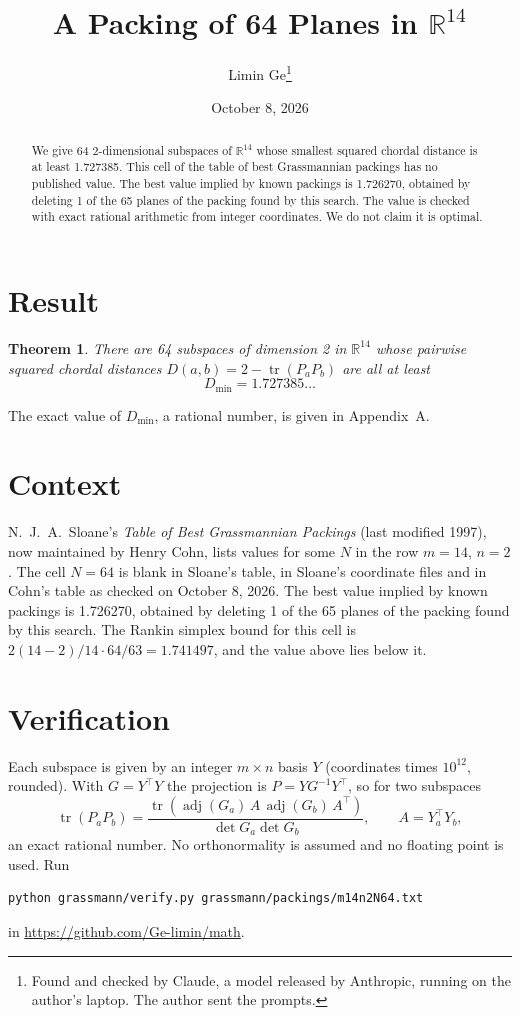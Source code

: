 \documentclass[11pt,a4paper]{article}
\title{A Packing of 64 Planes in $\mathbb{R}^{14}$}
\author{Limin Ge\thanks{Found and checked by Claude, a model released by Anthropic, running on the author's laptop. The author sent the prompts.}}
\date{October 8, 2026}
\newtheorem*{theorem}{Theorem}
\begin{document}
\maketitle
\begin{abstract}
We give 64 2-dimensional subspaces of $\mathbb{R}^{14}$ whose smallest squared chordal distance is at least 1.727385. This cell of the table of best Grassmannian packings has no published value. The best value implied by known packings is 1.726270, obtained by deleting 1 of the 65 planes of the packing found by this search. The value is checked with exact rational arithmetic from integer coordinates. We do not claim it is optimal.
\end{abstract}

\section{Result}
\begin{theorem}
There are 64 subspaces of dimension 2 in $\mathbb{R}^{14}$ whose pairwise squared chordal distances $D(a,b) = 2 - \operatorname{tr}(P_aP_b)$ are all at least
\[ D_{\min} = 1.727385\ldots \]
\end{theorem}
The exact value of $D_{\min}$, a rational number, is given in Appendix~A.


\section{Context}
N.~J.~A.~Sloane's \emph{Table of Best Grassmannian Packings} (last modified 1997), now maintained by Henry Cohn, lists values for some $N$ in the row $m=14$, $n=2$. The cell $N=64$ is blank in Sloane's table, in Sloane's coordinate files and in Cohn's table as checked on October 8, 2026. The best value implied by known packings is 1.726270, obtained by deleting 1 of the 65 planes of the packing found by this search. The Rankin simplex bound for this cell is $2(14-2)/14\cdot 64/63 = 1.741497$, and the value above lies below it.


\section{Verification}
Each subspace is given by an integer $m\times n$ basis $Y$ (coordinates times $10^{12}$, rounded). With $G=Y^\top Y$ the projection is $P=YG^{-1}Y^\top$, so for two subspaces
\[ \operatorname{tr}(P_aP_b)=\frac{\operatorname{tr}(\operatorname{adj}(G_a)\,A\,\operatorname{adj}(G_b)\,A^\top)}{\det G_a\det G_b},\qquad A=Y_a^\top Y_b, \]
an exact rational number. No orthonormality is assumed and no floating point is used. Run
\begin{verbatim}
python grassmann/verify.py grassmann/packings/m14n2N64.txt
\end{verbatim}
in \url{https://github.com/Ge-limin/math}.
\end{document}
